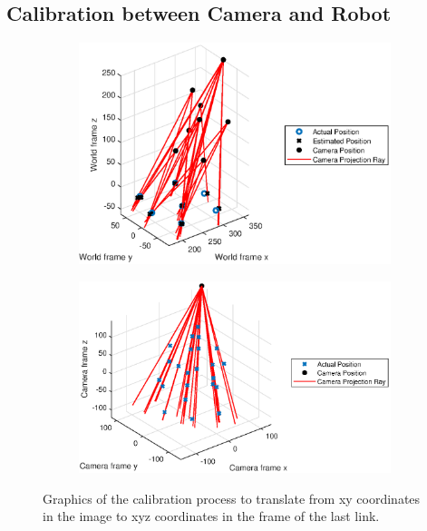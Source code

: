 \documentclass{article}
\begin{document}
\subsection{Calibration between Camera and Robot}
\begin{figure}[H]
	\centering
	\begin{subfigure}{.49\textwidth}
		\centering
		\includegraphics[keepaspectratio,width=\linewidth]{calibration1.eps}
	\end{subfigure}%
	\begin{subfigure}{.49\textwidth}
		\centering
		\includegraphics[keepaspectratio,width=\linewidth]{calibration2.eps}
	\end{subfigure}
	\caption{Graphics of the calibration process to translate from xy coordinates in the image to xyz coordinates in the frame of the last link.}
\end{figure}
\end{document}
